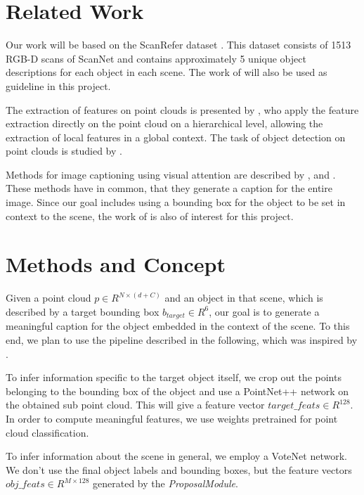 \documentclass[10pt,twocolumn,letterpaper]{article}
\begin{document}
\section{Related Work}
Our work will be based on the ScanRefer dataset \cite{Chen2019}. This dataset consists of 1513 RGB-D scans of ScanNet \cite{Dai2017} and contains approximately 5 unique object descriptions for each object in each scene. The work of \cite{Chen2019} will also be used as guideline in this project.

The extraction of features on point clouds is presented by \cite{Qi2017}, who apply the feature extraction directly on the point cloud on a hierarchical level, allowing the extraction of local features in a global context. 
The task of object detection on point clouds is studied by \cite{Qi2019}. 

Methods for image captioning using visual attention are described by \cite{Xu2015}, \cite{Lu2016} and \cite{Anderson2017}.
These methods have in common, that they generate a caption for the entire image.
Since our goal includes using a bounding box for the object to be set in context to the scene, the work of \cite{Rohrbach2015} is also of interest for this project. 

\section{Methods and Concept}

Given a point cloud $\mathit{p \in R^{N\times(d+C)}}$ and an object in that scene, which is described by a target bounding box $b_{target}\in R^6$, our goal is to generate a meaningful caption for the object embedded in the context of the scene. To this end, we plan to use the pipeline described in the following, which was inspired by \cite{Anderson2017}.

To infer information specific to the target object itself, we crop out the points belonging to the bounding box of the object and use a PointNet++ \cite{Qi2017} network on the obtained sub point cloud. This will give a feature vector $\mathit{target\_feats}\in R^{128}$. In order to compute meaningful features, we use weights pretrained for point cloud classification.

To infer information about the scene in general, we employ a VoteNet \cite{Qi2019} network. We don't use the final object labels and bounding boxes, but the feature vectors $\mathit{obj\_feats}\in R^{M\times128}$ generated by the \textit{ProposalModule}.
\end{document}
